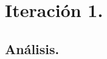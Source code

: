 \documentclass[12pt, a4paper, titlepage]{report}
\begin{document}

    \part{Iteración 1.}
    
	\chapter{\textcolor{azulescom}{Análisis.}}
	    
\end{document}
